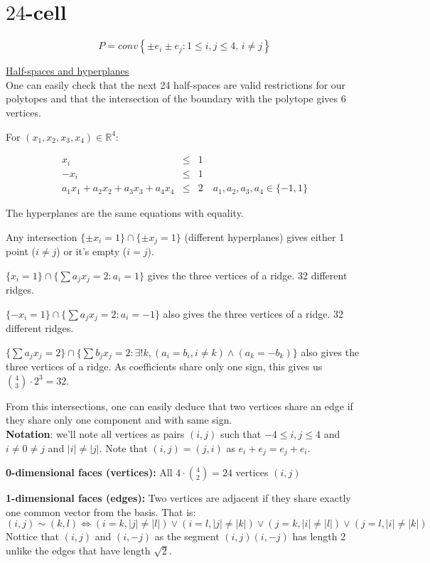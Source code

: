 \documentclass[paper=a4, fontsize=11pt]{scrartcl} %
\theoremstyle{plain}
\begin{document}
\section{$24$-cell}

$$ P = conv\left\lbrace \pm e_i \pm e_j : 1\leq i,j\leq 4,\, i\neq j \right\rbrace$$

\underline{Half-spaces and hyperplanes} \\

One can easily check that the next 24 half-spaces are valid restrictions for our polytopes and that the intersection of the boundary with the polytope gives 6 vertices.

For $(x_1, x_2, x_3, x_4) \in \mathbb{R}^4$:

$$   
	\begin{array}{rcl}
      x_i & \leq & 1 \\
     -x_i & \leq & 1 \\
     a_1x_1 + a_2x_2 + a_3x_3 + a_4x_4 & \leq & 2 \quad a_1,a_2,a_3,a_4 \in \{ -1, 1 \}
	\end{array}
$$

The hyperplanes are the same equations with equality.

Any intersection $\{\pm x_i = 1\} \cap \{\pm x_j = 1 \}$ (different hyperplanes) gives either 1 point ($i\neq j$) or it's empty ($i=j$).

$\{x_i = 1\} \cap \{  \sum a_j x_j = 2 : a_i = 1\}$ gives the three vertices of a ridge. 32 different ridges.

$\{-x_i = 1\} \cap \{  \sum a_j x_j = 2 : a_i = -1\}$ also gives the three vertices of a ridge. 32 different ridges.

$\{\sum a_j x_j = 2\} \cap \{  \sum b_j x_j = 2: \exists ! k, (a_i = b_i, i\neq k) \wedge (a_k = -b_k) \}$ also gives the three vertices of a ridge. As coefficients share only one sign, this gives us ${4 \choose 3} \cdot 2^3 = 32$.

From this intersections, one can easily deduce that two vertices share an edge if they share only one component and with same sign.\\

\textbf{Notation}: we'll note all vertices as pairs $(i,j)$ such that $ -4 \leq i,j \leq 4$ and $i \neq 0 \neq j$ and $\vert i \vert \neq \vert j \vert$. Note that $(i,j)=(j,i)$ as $e_i+e_j = e_j + e_i$.

\textbf{0-dimensional faces (vertices):} All $4 \cdot {4 \choose 2} = 24$ vertices $(i,j)$

\textbf{1-dimensional faces (edges):} Two vertices are adjacent if they share exactly one common vector from the basis. That is:
$$(i,j) \sim (k,l) \iff (i=k,\vert j \vert \neq \vert l \vert) \vee (i=l,\vert j \vert \neq \vert k \vert) \vee (j=k,\vert i \vert \neq \vert l \vert) \vee (j=l,\vert i \vert \neq \vert k \vert)$$
Nottice that $(i,j)$ and $(i,-j)$ as the segment $(i,j)(i,-j)$ has length 2 unlike the edges that have length $\sqrt{2}$.
\end{document}
